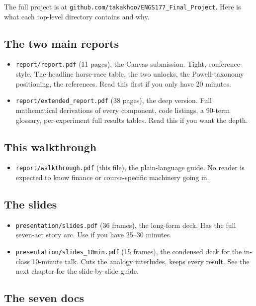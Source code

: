 \documentclass[11pt]{article}
\begin{document}
The full project is at \texttt{github.com/takakhoo/ENGS177\_Final\_Project}. Here is what each top-level directory contains and why.

\subsection{The two main reports}

\begin{itemize}
  \item \texttt{report/report.pdf} (11 pages), the Canvas submission. Tight, conference-style. The headline horse-race table, the two unlocks, the Powell-taxonomy positioning, the references. Read this first if you only have 20 minutes.
  \item \texttt{report/extended\_report.pdf} (38 pages), the deep version. Full mathematical derivations of every component, code listings, a 90-term glossary, per-experiment full results tables. Read this if you want the depth.
\end{itemize}

\subsection{This walkthrough}

\begin{itemize}
  \item \texttt{report/walkthrough.pdf} (this file), the plain-language guide. No reader is expected to know finance or course-specific machinery going in.
\end{itemize}

\subsection{The slides}

\begin{itemize}
  \item \texttt{presentation/slides.pdf} (36 frames), the long-form deck. Has the full seven-act story arc. Use if you have 25--30 minutes.
  \item \texttt{presentation/slides\_10min.pdf} (15 frames), the condensed deck for the in-class 10-minute talk. Cuts the analogy interludes, keeps every result. See the next chapter for the slide-by-slide guide.
\end{itemize}

\subsection{The seven docs}
\end{document}

